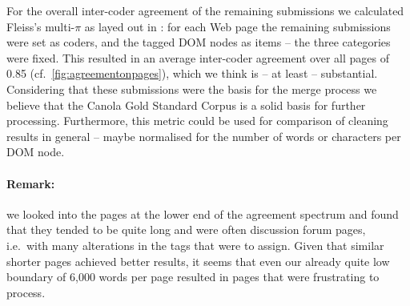 \begin{longversion}


For the overall inter-coder agreement of the remaining submissions we calculated Fleiss's multi-$\pi$ as layed out in \cite{ArtsteinPoesio2008}: for each Web page the remaining submissions were set as coders, and the tagged DOM nodes as items -- the three categories were fixed.
This resulted in an average inter-coder agreement over all pages of 0.85 (cf.~\ref{fig:agreementonpages}), which we think is -- at least -- substantial.
Considering that these submissions were the basis for the merge process we believe that the Canola Gold Standard Corpus is a solid basis for further processing.
Furthermore, this metric could be used for comparison of cleaning results in general -- maybe normalised for the number of words or characters per DOM node.


\paragraph{Remark:} we looked into the pages at the lower end of the agreement spectrum and found that they tended to be quite long and were often discussion forum pages, i.e.~with many alterations in the tags that were to assign. Given that similar shorter pages achieved better results, it seems that even our already quite low boundary of 6,000 words per page resulted in pages that were frustrating to process.
%
%
\end{longversion}

